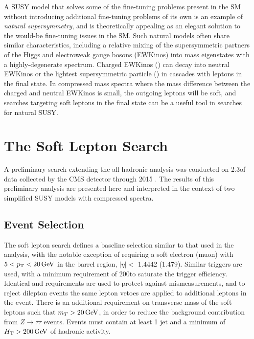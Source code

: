A SUSY model that solves some of the fine-tuning problems present in the SM without introducing additional fine-tuning problems of its own is an example of {\it natural supersymmetry}, and is theoretically appealing as an elegant solution to the would-be fine-tuning issues in the SM. Such natural models often share similar characteristics, including a relative mixing of the supersymmetric partners of the Higgs and electroweak gauge bosons (EWKinos) into mass eigenstates with a highly-degenerate spectrum. Charged EWKinos (\chipm) can decay into neutral EWKinos or the lightest supersymmetric particle (\chiz) in cascades with leptons in the final state. In compressed mass spectra where the mass difference between the charged and neutral EWKinos is small, the outgoing leptons will be soft, and searches targeting soft leptons in the final state can be a useful tool in searches for natural SUSY.

\section{The Soft Lepton Search}
\label{sec:softlep}

A preliminary search extending the all-hadronic analysis was conducted on 2.3\fbinv of data collected by the CMS detector through 2015 \cite{CMS-PAS-SUS-16-011}. The results of this preliminary analysis are presented here and interpreted in the context of two simplified SUSY models with compressed spectra.

\subsection{Event Selection}
\label{subsec:softevents}
The soft lepton search defines a baseline selection similar to that used in the \mttwo analysis, with the notable exception of requiring a soft electron (muon) with $5 < p_{\mathrm{T}} < 20\,\text{Ge\hspace{-.08em}V}$ in the barrel region, $|\eta| <$ 1.4442 (1.479). Similar \MET triggers are used, with a minimum \MET requirement of 200\GeV to saturate the trigger efficiency. Identical \dphilong and \htovermet requirements are used to protect against \MET mismeasurements, and
to reject dilepton events the same lepton vetoes are applied to additional leptons in the event. There is an additional requirement on transverse mass of the soft leptons such that $m_T > 20\,\text{Ge\hspace{-.08em}V}$, in order to reduce the background contribution from $Z\rightarrow\tau\tau$ events. Events must contain at least 1 jet and a minimum of $H_{\mathrm{T}} > 200\,\text{Ge\hspace{-.08em}V}$ of hadronic activity.


